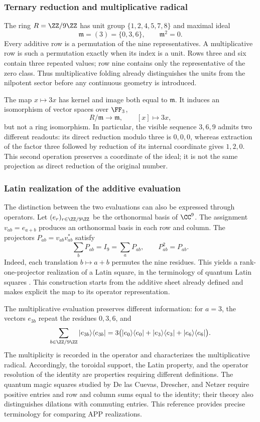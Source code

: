 \subsubsection{Ternary reduction and multiplicative radical}

The ring \(R=\ZZ/9\ZZ\) has unit group \(\{1,2,4,5,7,8\}\) and maximal ideal
\[
 \mathfrak m=(3)=\{0,3,6\},\qquad\mathfrak m^2=0.
\]
Every additive row is a permutation of the nine representatives. A multiplicative row is such a permutation exactly when its index is a unit. Rows three and six contain three repeated values; row nine contains only the representative of the zero class. Thus multiplicative folding already distinguishes the units from the nilpotent sector before any continuous geometry is introduced.

The map \(x\mapsto3x\) has kernel and image both equal to \(\mathfrak m\). It induces an isomorphism of vector spaces over \(\FF_3\),
\[
 R/\mathfrak m\longrightarrow\mathfrak m,\qquad [x]\longmapsto3x,
\]
but not a ring isomorphism. In particular, the visible sequence \(3,6,9\) admits two different readouts: its direct reduction modulo three is \(0,0,0\), whereas extraction of the factor three followed by reduction of its internal coordinate gives \(1,2,0\). This second operation preserves a coordinate of the ideal; it is not the same projection as direct reduction of the original number.

\subsubsection{Latin realization of the additive evaluation}

The distinction between the two evaluations can also be expressed through
operators. Let \((e_r)_{r\in\ZZ/9\ZZ}\) be the orthonormal basis of \(\CC^9\).
The assignment \(v_{ab}=e_{a+b}\) produces an orthonormal basis in each row
and column. The projectors \(P_{ab}=v_{ab}v_{ab}^{*}\) satisfy
\[
 \sum_bP_{ab}=I_9=\sum_aP_{ab},\qquad P_{ab}^2=P_{ab}.
\]
Indeed, each translation \(b\mapsto a+b\) permutes the nine residues.
This yields a rank-one-projector realization of a Latin
square, in the terminology of quantum Latin squares
\cite{mustovicary,delascuevas2023}. This construction starts from the
additive sheet already defined and makes explicit the map to its operator representation.

The multiplicative evaluation preserves different information: for \(a=3\), the
vectors \(e_{3b}\) repeat the residues \(0,3,6\), and
\[
 \sum_{b\in\ZZ/9\ZZ}|e_{3b}\rangle\langle e_{3b}|
 =3\bigl(|e_0\rangle\langle e_0|+|e_3\rangle\langle e_3|
                    +|e_6\rangle\langle e_6|\bigr).
\]
The multiplicity is recorded in the operator and characterizes the multiplicative
radical. Accordingly, the toroidal support, the Latin property, and the
operator resolution of the identity are properties requiring different
definitions. The quantum magic squares studied by
De las Cuevas, Drescher, and Netzer require positive entries and row
and column sums equal to the identity; their theory also distinguishes
dilations with commuting entries\cite{delascuevas2020}. This reference
provides precise terminology for comparing APP realizations.

